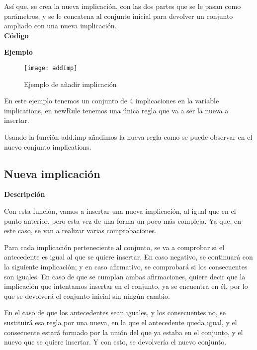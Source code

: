     As\'i que, se crea la nueva implicaci\'on, con las dos partes que se le pasan como par\'ametros, y se le concatena al conjunto 
    inicial para devolver un conjunto ampliado con una nueva implicaci\'on.
    \\


    \textbf{C\'odigo}

    
    \bigskip

    \textbf{Ejemplo}

    \begin{figure}[H]
        \centering
        \texttt{[image: addImp]}
        \caption{Ejemplo de a\~nadir implicaci\'on}
        \label{fig:addImp}
    \end{figure}

    En este ejemplo tenemos un conjunto de 4 implicaciones en la variable implications, en newRule tenemos una \'unica regla que va 
    a ser la nueva a insertar. 

    Usando la funci\'on add.imp a\~nadimos la nueva regla como se puede observar en el nuevo conjunto implications.



\subsection{Nueva implicaci\'on}

    \textbf{Descripci\'on}

    Con esta funci\'on, vamos a insertar una nueva implicaci\'on, al igual que en el punto anterior, pero esta vez 
    de una forma un poco m\'as compleja. Ya que, en este caso, se van a realizar varias comprobaciones.

    Para cada implicaci\'on perteneciente al conjunto, se va a comprobar si el antecedente es igual al que se quiere insertar.
    En caso negativo, se continuar\'a con la siguiente implicaci\'on; y en caso afirmativo, se comprobar\'a si los consecuentes son 
    iguales. En caso de que se cumplan ambas afirmaciones, quiere decir que la implicaci\'on que intentamos insertar en el conjunto, 
    ya se encuentra en \'el, por lo que se devolver\'a el conjunto inicial sin ning\'un cambio.

    En el caso de que los antecedentes sean iguales, y los consecuentes no, se sustituir\'a esa regla por una nueva, en la que el antecedente 
    queda igual, y el consecuente estar\'a formado por la uni\'on del que ya estaba en el conjunto, y el nuevo que se quiere insertar. Y con 
    esto, se devolver\'ia el nuevo conjunto.

